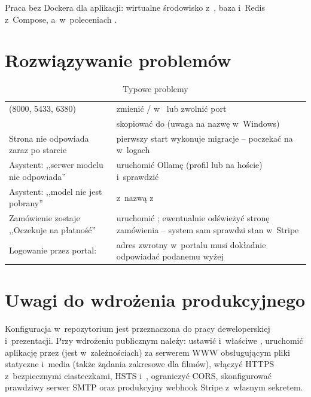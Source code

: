 Praca bez Dockera dla aplikacji: wirtualne środowisko  z~,
baza i~Redis z~Compose, a~w~poleceniach .

\section{Rozwiązywanie problemów}

\begin{table}[H]
\centering\small
\caption{Typowe problemy}
\begin{tabularx}{\linewidth}{@{}P{5.4cm}L@{}}
\toprule
{} &  \\
\midrule
{} (8000, 5433, 6380) & zmienić / w~ lub zwolnić port \\
 & skopiować  do  (uwaga na nazwę  w~Windows) \\
Strona nie odpowiada zaraz po starcie & pierwszy start wykonuje migracje -- poczekać na  w~logach \\
Asystent: ,,serwer modelu nie odpowiada'' & uruchomić Ollamę (profil  lub na hoście) i~sprawdzić  \\
Asystent: ,,model nie jest pobrany'' &  z~nazwą z~ \\
Zamówienie zostaje ,,Oczekuje na płatność'' & uruchomić ; ewentualnie odświeżyć stronę zamówienia -- system sam sprawdzi stan w~Stripe \\
Logowanie przez portal:  & adres zwrotny w~portalu musi dokładnie odpowiadać podanemu wyżej \\
\bottomrule
\end{tabularx}
\end{table}

\section{Uwagi do wdrożenia produkcyjnego}

Konfiguracja w~repozytorium jest przeznaczona do pracy deweloperskiej i~prezentacji. Przy
wdrożeniu publicznym należy: ustawić  i~właściwe
, uruchomić aplikację przez  (jest w~zależnościach) za
serwerem WWW obsługującym pliki statyczne i~media (także żądania zakresowe dla filmów),
włączyć HTTPS z~bezpiecznymi ciasteczkami, HSTS i~, ograniczyć
CORS, skonfigurować prawdziwy serwer SMTP oraz produkcyjny webhook Stripe z~własnym
sekretem.
